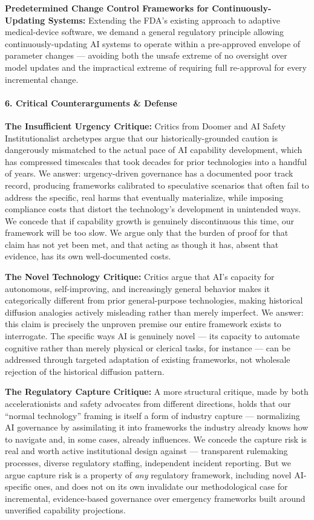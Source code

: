\textbf{Predetermined Change Control Frameworks for
Continuously-Updating Systems:} Extending the FDA's existing approach to
adaptive medical-device software, we demand a general regulatory
principle allowing continuously-updating AI systems to operate within a
pre-approved envelope of parameter changes --- avoiding both the unsafe
extreme of no oversight over model updates and the impractical extreme
of requiring full re-approval for every incremental change.

\paragraph{6. Critical Counterarguments \&
Defense}\label{critical-counterarguments-defense-20}

\textbf{The Insufficient Urgency Critique:} Critics from Doomer and AI
Safety Institutionalist archetypes argue that our historically-grounded
caution is dangerously mismatched to the actual pace of AI capability
development, which has compressed timescales that took decades for prior
technologies into a handful of years. We answer: urgency-driven
governance has a documented poor track record, producing frameworks
calibrated to speculative scenarios that often fail to address the
specific, real harms that eventually materialize, while imposing
compliance costs that distort the technology's development in unintended
ways. We concede that if capability growth is genuinely discontinuous
this time, our framework will be too slow. We argue only that the burden
of proof for that claim has not yet been met, and that acting as though
it has, absent that evidence, has its own well-documented costs.

\textbf{The Novel Technology Critique:} Critics argue that AI's capacity
for autonomous, self-improving, and increasingly general behavior makes
it categorically different from prior general-purpose technologies,
making historical diffusion analogies actively misleading rather than
merely imperfect. We answer: this claim is precisely the unproven
premise our entire framework exists to interrogate. The specific ways AI
is genuinely novel --- its capacity to automate cognitive rather than
merely physical or clerical tasks, for instance --- can be addressed
through targeted adaptation of existing frameworks, not wholesale
rejection of the historical diffusion pattern.

\textbf{The Regulatory Capture Critique:} A more structural critique,
made by both accelerationists and safety advocates from different
directions, holds that our ``normal technology'' framing is itself a
form of industry capture --- normalizing AI governance by assimilating
it into frameworks the industry already knows how to navigate and, in
some cases, already influences. We concede the capture risk is real and
worth active institutional design against --- transparent rulemaking
processes, diverse regulatory staffing, independent incident reporting.
But we argue capture risk is a property of \emph{any} regulatory
framework, including novel AI-specific ones, and does not on its own
invalidate our methodological case for incremental, evidence-based
governance over emergency frameworks built around unverified capability
projections.

